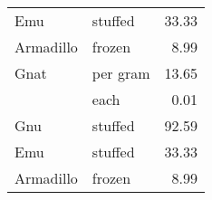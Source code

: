 {\begin{center}
\begin{xtabular}{|llr|}
Emu       & stuffed  & 33.33 \\
Armadillo & frozen   & 8.99  \\
Gnat      & per gram & 13.65 \\
          & each     & 0.01  \\
Gnu       & stuffed  & 92.59 \\
Emu       & stuffed  & 33.33 \\
Armadillo & frozen   & 8.99  \\
\hline
\end{xtabular}
\end{center}
} 
